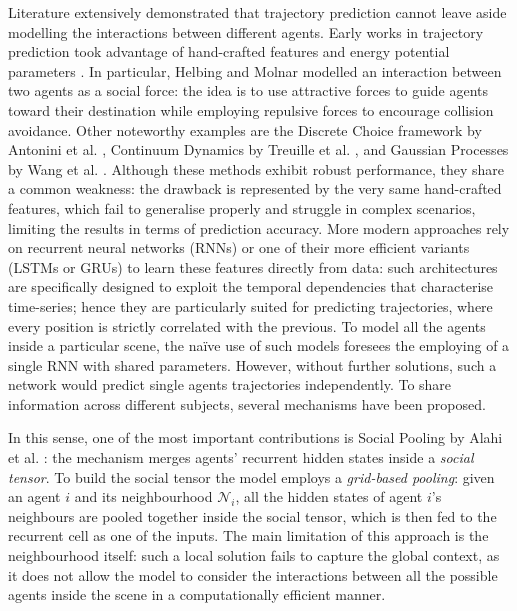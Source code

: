 \documentclass[10pt,a4paper,conference]{IEEEtran}
\begin{document}
Literature extensively demonstrated that trajectory prediction cannot leave aside modelling the interactions between different agents. 
Early works in trajectory prediction took advantage of hand-crafted features and energy potential parameters \cite{socialforce, discrete_choice, continuum_dynamics, gaussian_process}. In particular, Helbing and Molnar \cite{socialforce} modelled an interaction between two agents as a social force: the idea is to use attractive forces to guide agents toward their destination while employing repulsive forces to encourage collision avoidance. Other noteworthy examples are the Discrete Choice framework by Antonini et al. \cite{discrete_choice}, Continuum Dynamics by Treuille et al.
\cite{continuum_dynamics}, and Gaussian Processes by Wang et al. \cite{gaussian_process}. Although these methods exhibit robust performance, they share a common weakness: the drawback is represented by the very same hand-crafted features, which fail to generalise properly and struggle in complex scenarios, limiting the results in terms of prediction accuracy.
More modern approaches \cite{slstm, soft+, desire} rely on recurrent neural networks (RNNs) or one of their more efficient variants (LSTMs or GRUs) to learn these features directly from data: such architectures are specifically designed to exploit the temporal dependencies that characterise time-series; hence they are particularly suited for predicting trajectories, where every position is strictly correlated with the previous. To model all the agents inside a particular scene, the na\"ive use of such models foresees the employing of a single RNN with shared parameters. However, without further solutions, such a network would predict single agents trajectories independently.
To share information across different subjects, several mechanisms have been proposed.

In this sense, one of the most important contributions is Social Pooling by Alahi et al. \cite{slstm}: the mechanism merges agents' recurrent hidden states inside a \textit{social tensor}. To build the social tensor the model employs a \textit{grid-based pooling}: given an agent $i$ and its neighbourhood $\mathcal{N}_{i}$, all the hidden states of agent $i$'s neighbours are pooled together inside the social tensor, which is then fed to the recurrent cell as one of the inputs. The main limitation of this approach is the neighbourhood itself: such a local solution fails to capture the global context, as it does not allow the model to consider the interactions between all the possible agents inside the scene in a computationally efficient manner.
\end{document}

